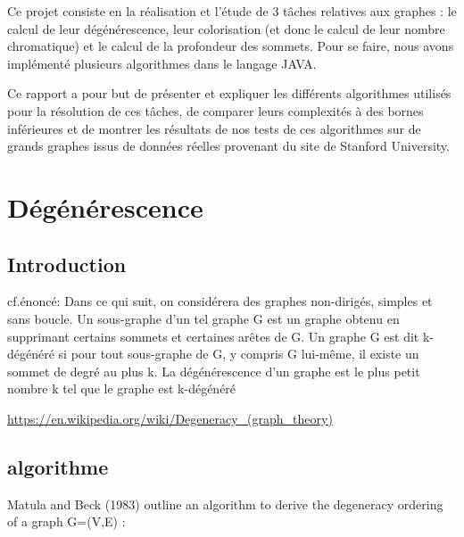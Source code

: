 Ce projet consiste en la réalisation et l'étude de 3 tâches relatives aux graphes : le calcul de leur dégénérescence, leur colorisation (et donc le calcul de leur nombre chromatique) et le calcul de la profondeur des sommets. Pour se faire, nous avons implémenté plusieurs algorithmes dans le langage JAVA.

Ce rapport a pour but de présenter et expliquer les différents algorithmes utilisés pour la résolution de ces tâches, de comparer leurs complexités à des bornes inférieures et de montrer les résultats de nos tests de ces algorithmes sur de grands graphes issus de données réelles provenant du site de Stanford University.









\newpage
\section{Dégénérescence}

\subsection{Introduction}
cf.énoncé:
Dans ce qui suit, on considérera des graphes non-dirigés, simples et sans boucle. Un sous-graphe d’un tel graphe G est un graphe obtenu en supprimant certains sommets et certaines arêtes de G. Un graphe G est dit k-dégénéré si pour tout sous-graphe de G, y compris G lui-même, il existe un sommet de degré au plus k. La dégénérescence d’un graphe est le plus petit nombre k tel que le graphe est k-dégénéré


\href{https://en.wikipedia.org/wiki/Degeneracy_(graph_theory)}{https://en.wikipedia.org/wiki/Degeneracy_(graph_theory)}

\subsection{algorithme}
\label{sec:Degenerescence_algorithme}

Matula and Beck (1983) outline an algorithm to derive the degeneracy ordering of a graph
{\displaystyle G=(V,E)} :

